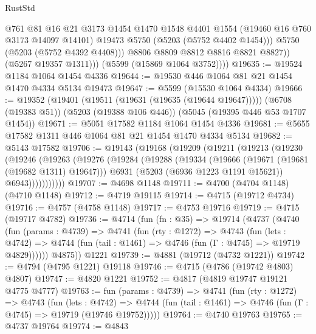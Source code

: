 \begin{lexlean}{RustStd}
\begin{coremodule}
                    @761
                    @81
                    @16
                    @21
                    @3173
                    @1454
                    @1470
                    @1548
                    @4401
                    @1554
                    (@19460 @16 @760 @3173 @14097 @14101)
                    @19473
                    @5750
                    (@5203 (@5752 @4402 @1454)))
                  @5750
                  (@5203 (@5752 @4392 @4408)))
                @8806
                @8809
                @8812
                @8816
                @8821
                @8827))
            (@5267 @19357 @1311)))
        (@5599 (@15869 @1064 @3752))))
@19635 := @19524 @1184 @1064 @1454 @4336
@19644 := @19530 @446 @1064 @81 @21 @1454 @1470 @4334 @5134 @19473
@19647 := @5599 (@15530 @1064 @4334)
@19666 := @19352
    (@19401 (@19511 (@19631 (@19635 (@19644 @19647)))))
    (@6708 (@19383 @51))
    (@5203 (@19388 @106 @446))
    (@5045 (@19395 @446 @53 @1707 @1454))
@19671 := @5051 @17582 @1184 @1064 @1454 @4336
@19681 := @5655 @17582 @1311 @446 @1064 @81 @21 @1454 @1470 @4334 @5134
@19682 := @5143 @17582
@19706 := @19143
    (@19168
      (@19209
        (@19211
          (@19213
            (@19230
              (@19246
                (@19263
                  (@19276
                    (@19284
                      (@19288
                        (@19334
                          (@19666 (@19671 (@19681 (@19682 @1311) @19647)))
                          @6931
                          (@5203 (@6936 @1223 @1191 @15621))
                          @6943)))))))))))
@19707 := @4698 @1148
@19711 := @4700 (@4704 @1148) (@4710 @1148)
@19712 := @4719 @19115
@19714 := @4715 (@19712 @4734)
@19716 := @4757 (@4758 @1148)
@19717 := @4753 @19716
@19719 := @4715 (@19717 @4782)
@19736 := @4714
    (fun (fn : @35) =>
    @19714
      (@4737
        (@4740
          (fun (params : @4739) =>
          @4741
            (fun (rty : @1272) =>
            @4743
              (fun (lets : @4742) =>
              @4744 (fun (tail : @1461) => @4746 (fun (Γ : @4745) => @19719 @4829))))))
        @4875))
    @1221
@19739 := @4881 (@19712 (@4732 @1221))
@19742 := @4794 (@4795 @1221) @19118
@19746 := @4715 (@4786 (@19742 @4803) @4807)
@19747 := @4820 @1221
@19752 := @4817 (@4819 @19747 @19121 @4775 @4777)
@19763 := fun (params : @4739) =>
  @4741
    (fun (rty : @1272) =>
    @4743
      (fun (lets : @4742) =>
      @4744 (fun (tail : @1461) => @4746 (fun (Γ : @4745) => @19719 (@19746 @19752)))))
@19764 := @4740 @19763
@19765 := @4737 @19764
@19774 := @4843

\end{coremodule}
\end{lexlean}
